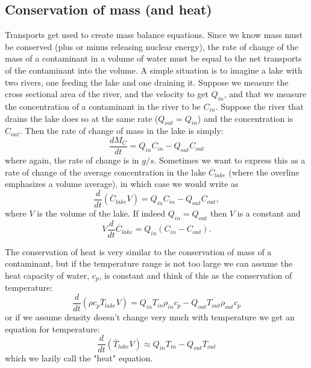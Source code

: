 \subsection{Conservation of mass (and heat)}

Transports get used to create mass balance equations.  Since we know mass must be conserved (plus or minus releasing nuclear energy), the rate of change of the mass of a contaminant in a volume of water must be equal to the net transports of the contaminant into the volume.  A simple situation is to imagine a lake with two rivers, one feeding the lake and one draining it.  Suppose we measure the cross sectional area of the river, and the velocity to get $Q_{in}$, and that we measure the concentration of a contaminant in the river to be $C_{in}$.  Suppose the river that drains the lake does so at the same rate ($Q_{out} = Q_{in}$) and the concentration is $C_{out}$.  Then the rate of change of mass in the lake is simply:
\begin{equation}
    \frac{d M_C}{dt} = Q_{in} C_{in} - Q_{out}C_{out}
\end{equation}
where again, the rate of change is in $g/s$.  Sometimes we want to express this as a rate of change of the average concentration in the lake $\overline{C}_{lake}$ (where the overline emphasizes a volume average), in which case we would write as 
\begin{equation}
    \frac{d}{dt}\left(\overline{C}_{lake} V\right) = Q_{in} C_{in} - Q_{out}C_{out},
\end{equation}
where $V$ is the volume of the lake. If indeed $Q_{in} = Q_{out}$ then $V$ is a constant and 
\begin{equation}
    V\frac{d}{dt} \overline{C}_{lake}= Q_{in} \left(C_{in} - C_{out}\right).  
\end{equation}

The conservation of heat is very similar to the conservation of mass of a contaminant, but if the temperature range is not too large we can assume the heat capacity of water, $c_p$, is constant and think of this as the conservation of temperature:
\begin{equation}
    \frac{d}{dt}\left(\rho c_p \overline{T}_{lake} V\right) = Q_{in} T_{in}\rho_{in} c_p - Q_{out}T_{out} \rho_{out} c_p
\end{equation}
or if we assume density doesn't change very much with temperature we get an equation for temperature:
\begin{equation}
    \frac{d}{dt}\left(\overline{T}_{lake} V\right) \approx Q_{in} T_{in} - Q_{out}T_{out} 
\end{equation}
which we lazily call the "heat" equation.  


